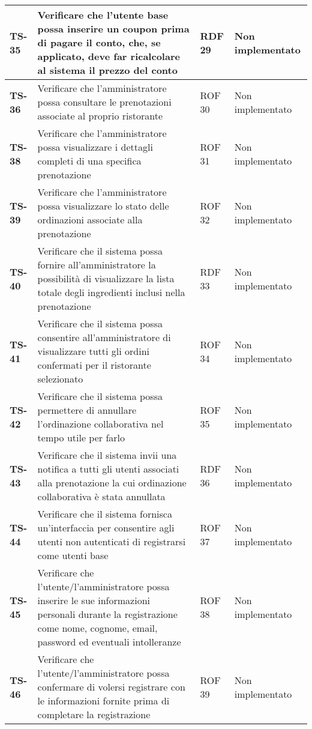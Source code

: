 \begin{longtable}{|>{\centering\arraybackslash}p{1.5cm}|p{9.8cm}|p{2cm}|p{3.5cm}|}
    \hline
    \rowcolor{gray!10}
    \textbf{TS-35} & Verificare che l'utente base possa inserire un coupon prima di pagare il conto, che, se applicato, deve far ricalcolare al sistema il prezzo del conto & RDF 29 & Non implementato \\ 
    \hline
    \rowcolor{gray!10}
    \textbf{TS-36} & Verificare che l'amministratore possa consultare le prenotazioni associate al proprio ristorante & ROF 30 & Non implementato \\ 
    \hline
    \rowcolor{gray!10}
    \textbf{TS-38} & Verificare che l'amministratore possa visualizzare i dettagli completi di una specifica prenotazione & ROF 31 & Non implementato \\ 
    \hline
    \rowcolor{gray!10}
    \textbf{TS-39} & Verificare che l'amministratore possa visualizzare lo stato delle ordinazioni associate alla prenotazione & ROF 32 & Non implementato \\ 
    \hline
    \rowcolor{gray!10}
    \textbf{TS-40} & Verificare che il sistema possa fornire all'amministratore la possibilità di visualizzare la lista totale degli ingredienti inclusi nella prenotazione & RDF 33 & Non implementato \\ 
    \hline
    \rowcolor{gray!10}
    \textbf{TS-41} & Verificare che il sistema possa consentire all'amministratore di visualizzare tutti gli ordini confermati per il ristorante selezionato & ROF 34 & Non implementato \\ 
    \hline
    \rowcolor{gray!10}
    \textbf{TS-42} & Verificare che il sistema possa permettere di annullare l'ordinazione collaborativa nel tempo utile per farlo & ROF 35 & Non implementato \\
    \hline
    \rowcolor{gray!10}
    \textbf{TS-43} & Verificare che il sistema invii una notifica a tutti gli utenti associati alla prenotazione la cui ordinazione collaborativa è stata annullata & RDF 36 & Non implementato \\ 
    \hline
    \rowcolor{gray!10}
    \textbf{TS-44} & Verificare che il sistema fornisca un'interfaccia per consentire agli utenti non autenticati di registrarsi come utenti base & ROF 37 & Non implementato \\ 
    \hline
    \rowcolor{gray!10}
    \textbf{TS-45} & Verificare che l'utente/l'amministratore possa inserire le sue informazioni personali durante la registrazione come nome, cognome, email, password ed eventuali intolleranze & ROF 38 & Non implementato \\
    \hline
    \rowcolor{gray!10}
    \textbf{TS-46} & Verificare che l'utente/l'amministratore possa confermare di volersi registrare con le informazioni fornite prima di completare la registrazione & ROF 39 & Non implementato \\ 

\end{longtable}
